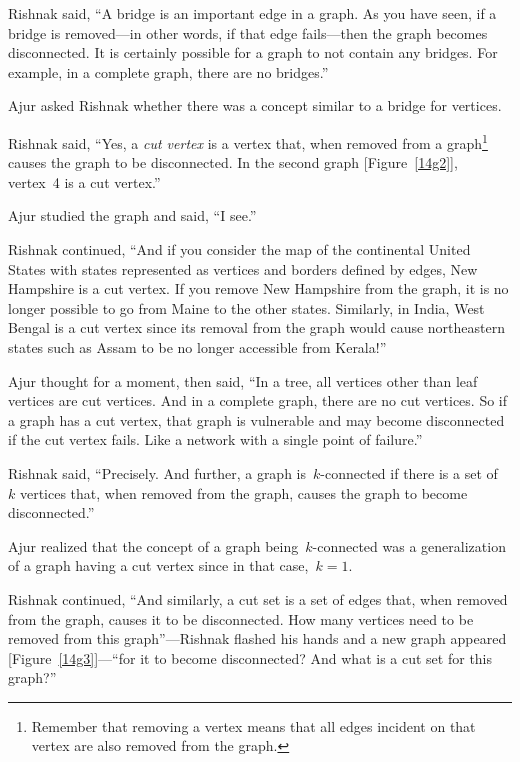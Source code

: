 Rishnak said, ``A bridge is an important edge in a graph. As you have seen, if a bridge is removed---in other words, if that edge fails---then the graph becomes disconnected. It is certainly possible for a graph to not contain any bridges. For example, in a complete graph, there are no
bridges.''

Ajur asked Rishnak whether there was a concept similar to a bridge for vertices.

Rishnak said, ``Yes, a \textit{cut vertex} is a vertex that, when removed from a graph\footnote{Remember that removing a vertex means that all edges incident on that vertex are also removed from the graph.} causes the graph to be disconnected. In the second graph [Figure~\ref{14g2}], vertex~4 is a cut vertex.''

Ajur studied the graph and said, ``I see.''

Rishnak continued, ``And if you consider the map of the continental United States with states represented as vertices and borders defined by edges, New Hampshire is a cut vertex. If you remove New Hampshire from the graph, it is no longer possible to go from Maine to the other states. Similarly, in India, West Bengal is a cut vertex since its removal from the graph would cause northeastern states such as Assam to be no longer accessible from Kerala!''

Ajur thought for a moment, then said, ``In a tree, all vertices other than leaf vertices are cut vertices. And in a complete graph, there are no cut vertices. So if a graph has a cut vertex, that graph is vulnerable and may become disconnected if the cut vertex fails. Like a network with a single point of failure.''

Rishnak said, ``Precisely. And further, a graph is~$k$-connected if there is a set of~$k$ vertices that, when removed from the graph, causes the graph to become disconnected.''

Ajur realized that the concept of a graph being~$k$-connected was a generalization of a graph having a cut vertex since in that case,~$k=1$.

Rishnak continued, ``And similarly, a cut set is a set of edges that, when removed from the graph, causes it to be disconnected. How many vertices need to be removed from this graph''---Rishnak flashed his hands and a new graph appeared [Figure~\ref{14g3}]---``for it to become disconnected? And what is a cut set for this graph?''

